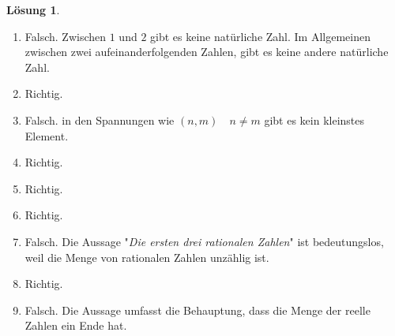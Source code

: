 \documentclass{article}
\theoremstyle{definition}
\newtheorem*{lo*}{Lösung}
\begin{document}
\begin{tcolorbox}
	\begin{lo*}
		\begin{enumerate}
			\item Falsch. Zwischen $ 1 $ und $ 2 $ gibt es keine natürliche Zahl. Im Allgemeinen zwischen zwei aufeinanderfolgenden Zahlen, gibt es keine andere natürliche Zahl.
			\item 
			Richtig.
			\item 
			Falsch. in den Spannungen wie $ (n,m) \quad n \neq m $ gibt es kein kleinstes Element.
			\item Richtig.
			\item Richtig.
			\item Richtig.
			\item Falsch. Die Aussage "\textit{Die ersten drei rationalen Zahlen}" ist bedeutungslos, weil die Menge von rationalen Zahlen unzählig ist. 
			\item Richtig.
			\item Falsch. Die Aussage umfasst die Behauptung, dass die Menge der reelle Zahlen ein Ende hat.  
		\end{enumerate}
	\end{lo*}
\end{tcolorbox}
\end{document}
